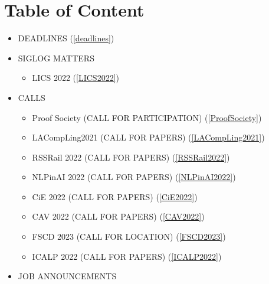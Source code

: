 \documentclass[prodmode,acmtecs]{acmsmall} %
\begin{document}
\section{Table of Content}\begin{itemize}\item DEADLINES (\cref{deadlines}) 
 
\item SIGLOG MATTERS 
 
\begin{itemize}\item LICS 2022 (\cref{LICS2022})
\end{itemize} 
\item CALLS 
 
\begin{itemize}\item Proof Society (CALL FOR PARTICIPATION) (\cref{ProofSociety})
\item LACompLing2021 (CALL FOR PAPERS) (\cref{LACompLing2021})
\item RSSRail 2022 (CALL FOR PAPERS) (\cref{RSSRail2022})
\item NLPinAI 2022 (CALL FOR PAPERS) (\cref{NLPinAI2022})
\item CiE 2022 (CALL FOR PAPERS) (\cref{CiE2022})
\item CAV 2022 (CALL FOR PAPERS) (\cref{CAV2022})
\item FSCD 2023 (CALL FOR LOCATION) (\cref{FSCD2023})
\item ICALP 2022 (CALL FOR PAPERS) (\cref{ICALP2022})
\end{itemize} 
\item JOB ANNOUNCEMENTS 
 

\end{itemize}
\end{document}
